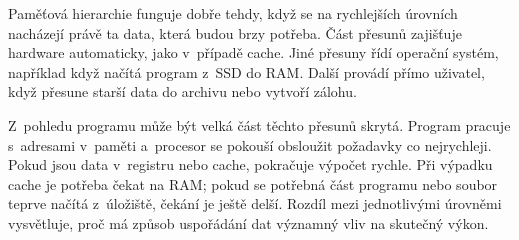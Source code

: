 Paměťová hierarchie funguje dobře tehdy, když se na rychlejších úrovních nacházejí právě ta data, která budou brzy potřeba. Část přesunů zajišťuje hardware automaticky, jako v~případě cache. Jiné přesuny řídí operační systém, například když načítá program z~SSD do RAM. Další provádí přímo uživatel, když přesune starší data do archivu nebo vytvoří zálohu.

Z~pohledu programu může být velká část těchto přesunů skrytá. Program pracuje s~adresami v~paměti a~procesor se pokouší obsloužit požadavky co nejrychleji. Pokud jsou data v~registru nebo cache, pokračuje výpočet rychle. Při výpadku cache je potřeba čekat na RAM; pokud se potřebná část programu nebo soubor teprve načítá z~úložiště, čekání je ještě delší. Rozdíl mezi jednotlivými úrovněmi vysvětluje, proč má způsob uspořádání dat významný vliv na skutečný výkon.

